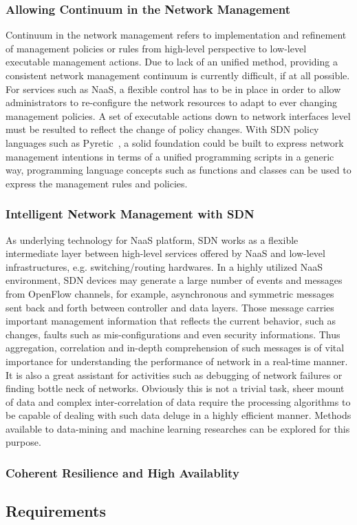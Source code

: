 	\subsubsection{Allowing Continuum in the Network Management}

	Continuum in the network management refers to implementation and refinement
	of management policies or rules from high-level perspective to low-level
	executable management actions. Due to lack of an unified method, providing
	a consistent network management continuum is currently difficult, if at all
	possible. For services such as NaaS, a flexible control has to be in place
	in order to allow administrators to re-configure the network resources to
	adapt to ever changing management policies. A set of executable actions
	down to network interfaces level must be resulted to reflect the change of
	policy changes. With SDN policy languages such as Pyretic~\cite{pyretic}, a
	solid foundation could be built to express network management intentions
	in terms of a unified programming scripts in a generic way, programming
	language concepts such as functions and classes can be used to express the
	management rules and policies.


	\subsubsection{Intelligent Network Management with SDN}

	As underlying technology for NaaS platform, SDN works as a flexible
	intermediate layer between high-level services offered by NaaS and
	low-level infrastructures, e.g. switching/routing hardwares.  In a highly
	utilized NaaS environment, SDN devices may generate a large number of
	events and messages from OpenFlow channels, for example, asynchronous and
	symmetric messages sent back and forth between controller and data layers.
	Those message carries important management information that reflects the
	current behavior, such as changes, faults such as mis-configurations and
	even security informations. Thus aggregation, correlation and in-depth
	comprehension of such messages is of vital importance for understanding the
	performance of network in a real-time manner. It is also a great assistant
	for activities such as debugging of network failures or finding bottle neck
	of networks.  Obviously this is not a trivial task, sheer mount of data and
	complex inter-correlation of data require the processing algorithms to be
	capable of dealing with such data deluge in a highly efficient manner.
	Methods available to data-mining and machine learning researches can be
	explored for this purpose.
	
	\subsubsection{Coherent Resilience and High Availablity}
	
	


	\subsection{Requirements}
